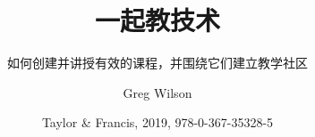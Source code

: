 \documentclass[]{../tex/krantz}
\begin{document}
\title{一起教技术}
\subtitle{如何创建并讲授有效的课程，并围绕它们建立教学社区}
\author{Greg Wilson}
\date{Taylor \& Francis, 2019, 978-0-367-35328-5}
\maketitle

\frontmatter

\tableofcontents


\mainmatter
















\cleardoublepage

\printbibliography

\appendix









\printindex
\end{document}
